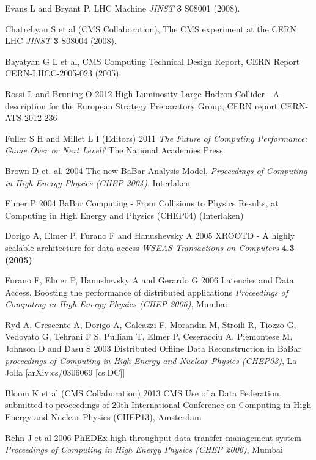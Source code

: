 \documentclass[a4paper]{jpconf}
\begin{document}
\begin{thebibliography}{9}
 Evans L and Bryant P,  LHC Machine {\it JINST}
  {\bf 3} S08001 (2008).

 Chatrchyan S et al (CMS Collaboration),  The CMS
  experiment at the CERN LHC {\it JINST} {\bf 3} S08004 (2008).

 Bayatyan G L et al,  CMS Computing Technical Design
  Report, CERN Report CERN-LHCC-2005-023 (2005).

 Rossi L and Bruning O 2012 High Luminosity Large Hadron
  Collider - A description for the European Strategy Preparatory
  Group, CERN report CERN-ATS-2012-236

 Fuller S H and Millet L I (Editors) 2011 {\it The
  Future of Computing Performance:  Game Over or Next Level?}
  The National Academies Press.

 Brown D et. al. 2004 The new BaBar Analysis
  Model, {\it Proceedings of Computing in High Energy Physics (CHEP
    2004)}, Interlaken 

 Elmer P 2004 BaBar Computing - From Collisions to
  Physics Results, at Computing in High Energy and Physics (CHEP04)
  (Interlaken)

 Dorigo A, Elmer P, Furano F and Hanushevsky A 2005
  XROOTD - A highly scalable architecture for data access {\it WSEAS
    Transactions on Computers} {\bf 4.3 (2005)}

 Furano F, Elmer P, Hanushevsky A and Gerardo G 2006
  Latencies and Data Access. Boosting the performance of distributed
  applications {\it Proceedings of Computing in High Energy Physics
    (CHEP 2006)}, Mumbai

 Ryd A, Crescente A, Dorigo A, Galeazzi F, Morandin
  M, Stroili R, Tiozzo G, Vedovato G, Tehrani F S, Pulliam T, Elmer P,
  Ceseracciu A, Piemontese M, Johnson D and Dasu S 2003 Distributed
  Offline Data Reconstruction in BaBar {\it proceedings of Computing
    in High Energy and Nuclear Physics (CHEP03)}, La Jolla
  [arXiv:cs/0306069 [cs.DC]]

 Bloom K et al (CMS Collaboration) 2013 CMS Use of
  a Data Federation, submitted to proceedings of 20th International
  Conference on Computing in High Energy and Nuclear Physics (CHEP13),
  Amsterdam

 Rehn J et al 2006 PhEDEx high-throughput data
  transfer management system {\it Proceedings of Computing in High
    Energy Physics (CHEP 2006)}, Mumbai


\end{thebibliography}
\end{document}
